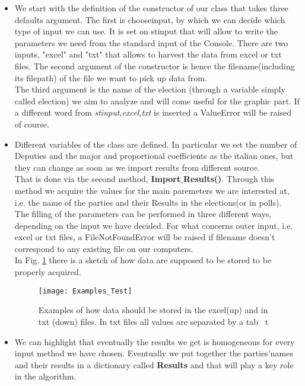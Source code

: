 \documentclass[12pt,a4paper,openright]{report}
\begin{document}
\begin{itemize}
	

\item We start with the definition of the constructor of our class that takes three defaults argument. The first is chooseinput, by which we can decide which type of input we can use. It is set on stinput that will allow to write the parameters we need from the standard input of the Console. There are two inputs, "excel" and "txt" that allows to harvest the data from excel or txt files. The second argument of the constructor is hence the filename(including its filepath) of the file we want to pick up data from.\\
The third argument is the name of the election (through a variable simply called election) we aim to analyze and will come useful for the graphic part.
If a different word from \textit{stinput,excel,txt} is inserted a ValueError will be raised of course.\\
\item Different variables of the class are defined. In particular we set the number of Deputies and the major and proportional coefficients as the italian ones, but they can change as soon as we import results from different source.\\
That is done via the second method, \textbf{Import$\_$Results()}. Through this method we acquire the values for the main paremeters we are interested at, i.e. the name of the parties and their Results in the elections(or in polls).\\
The filling of the parameters can be performed in three different ways, depending on the input we have decided. For what concerns outer input, i.e. excel or txt files, a FileNotFoundError will be raised if filename doesn't correspond to any existing file  on our computers.\\
In Fig. \ref{fig:examplestest}  there is a sketch of how data are supposed to be stored to be properly acquired.\\
\begin{figure}
	\centering
	\texttt{[image: Examples\_Test]}
	\caption{Examples of how data should be stored in the excel(up) and in txt (down) files. In txt files all values are separated by a tab \ t}
	\label{fig:examplestest}
\end{figure}
\item We can highlight that eventually the results we get is homogeneous for every input method we have chosen. Eventually we put together the parties'names and their results in a dictionary called \textbf{Results} and that will play a key role in the algorithm.

\end{itemize}
\end{document}
